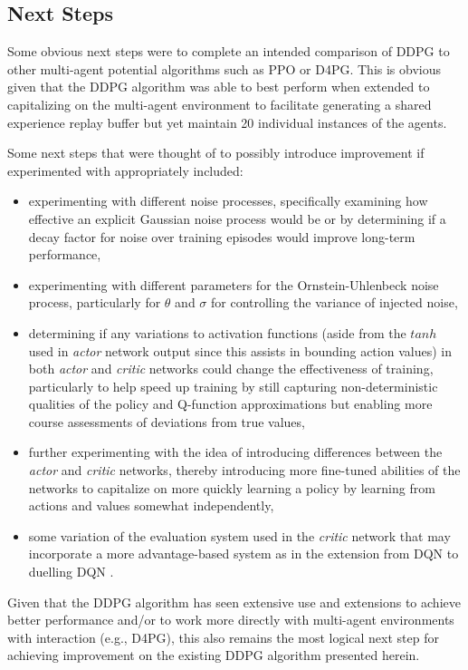 \documentclass[11pt]{article}
\begin{document}
\subsection{Next Steps}

Some obvious next steps were to complete an intended comparison of DDPG to other multi-agent potential algorithms such as PPO or D4PG. This is obvious given that the DDPG algorithm was able to best perform when extended to capitalizing on the multi-agent environment to facilitate generating a shared experience replay buffer but yet maintain 20 individual instances of the agents.

Some next steps that were thought of to possibly introduce improvement if experimented with appropriately included:
\begin{itemize}
	\item experimenting with different noise processes, specifically examining how effective an explicit Gaussian noise process would be or by determining if a decay factor for noise over training episodes would improve long-term performance,
	\item experimenting with different parameters for the Ornstein-Uhlenbeck noise process, particularly for $\theta$ and $\sigma$ for controlling the variance of injected noise,
	\item determining if any variations to activation functions (aside from the $tanh$ used in \textit{actor} network output since this assists in bounding action values) in both \textit{actor} and \textit{critic} networks could change the effectiveness of training, particularly to help speed up training by still capturing non-deterministic qualities of the policy and Q-function approximations but enabling more course assessments of deviations from true values,
	\item further experimenting with the idea of introducing differences between the \textit{actor} and \textit{critic} networks, thereby introducing more fine-tuned abilities of the networks to capitalize on more quickly learning a policy by learning from actions and values somewhat independently,
	\item some variation of the evaluation system used in the \textit{critic} network that may incorporate a more advantage-based system as in the extension from DQN to duelling DQN \cite{duelling}.
\end{itemize}

Given that the DDPG algorithm has seen extensive use and extensions to achieve better performance and/or to work more directly with multi-agent environments with interaction (e.g., D4PG), this also remains the most logical next step for achieving improvement on the existing DDPG algorithm presented herein.
\end{document}
